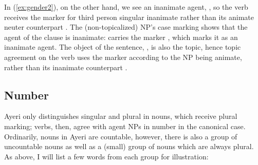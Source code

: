 In (\ref{ex:gender2}), on the other hand, we see an inanimate agent,
, so the verb receives the marker  
for third person singular inanimate rather than its animate neuter counterpart
. The (non-topicalized) NP's case marking shows that the agent 
of the clause is inanimate:  carries the marker
, which marks it as an inanimate agent. The object of the 
sentence, , is also the topic, hence topic
agreement on the verb uses the marker  according to the NP being
animate, rather than its inanimate counterpart .


\subsection{Number}

Ayeri only distinguishes singular and plural in nouns, which receive plural 
marking; verbs, then, agree with agent NPs in number in the canonical case. 
Ordinarily, nouns in Ayeri are countable, however, there is also a group of 
uncountable nouns as well as a (small) group of nouns which are always plural. 
As above, I will list a few words from each group for illustration:

